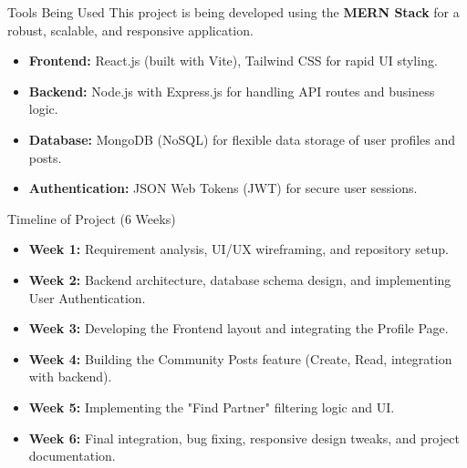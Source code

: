 \documentclass[11pt]{beamer}
\begin{document}
\begin{frame}{Tools Being Used}
    This project is being developed using the \textbf{MERN Stack} for a robust, scalable, and responsive application.
    \vspace{0.5cm}
    \begin{itemize}
        \item \textbf{Frontend:} React.js (built with Vite), Tailwind CSS for rapid UI styling.
        \item \textbf{Backend:} Node.js with Express.js for handling API routes and business logic.
        \item \textbf{Database:} MongoDB (NoSQL) for flexible data storage of user profiles and posts.
        \item \textbf{Authentication:} JSON Web Tokens (JWT) for secure user sessions.
    \end{itemize}
\end{frame}

\begin{frame}{Timeline of Project (6 Weeks)}
    \begin{itemize}
        \item \textbf{Week 1:} Requirement analysis, UI/UX wireframing, and repository setup.
        \item \textbf{Week 2:} Backend architecture, database schema design, and implementing User Authentication.
        \item \textbf{Week 3:} Developing the Frontend layout and integrating the Profile Page.
        \item \textbf{Week 4:} Building the Community Posts feature (Create, Read, integration with backend).
        \item \textbf{Week 5:} Implementing the "Find Partner" filtering logic and UI.
        \item \textbf{Week 6:} Final integration, bug fixing, responsive design tweaks, and project documentation.
    \end{itemize}
\end{frame}
\end{document}
